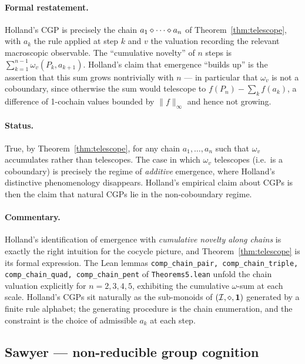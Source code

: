\paragraph{Formal restatement.} Holland's CGP is precisely the chain
$a_1 \mathbin{\diamond} \cdots \mathbin{\diamond} a_n$ of Theorem~\ref{thm:telescope}, with
$a_k$ the rule applied at step $k$ and $v$ the valuation recording the
relevant macroscopic observable. The ``cumulative novelty'' of $n$ steps is
$\sum_{k=1}^{n-1} \omega_v(P_k, a_{k+1})$. Holland's claim that emergence
``builds up'' is the assertion that this sum grows nontrivially with $n$ ---
in particular that $\omega_v$ is not a coboundary, since otherwise the
sum would telescope to $f(P_n) - \sum_k f(a_k)$, a difference of
1-cochain values bounded by $\|f\|_\infty$ and hence not growing.

\paragraph{Status.} True, by Theorem~\ref{thm:telescope}, for any chain
$a_1, \dots, a_n$ such that $\omega_v$ accumulates rather than telescopes.
The case in which $\omega_v$ telescopes (i.e.\ is a coboundary) is precisely
the regime of \emph{additive} emergence, where Holland's distinctive
phenomenology disappears. Holland's empirical claim about CGPs is then the
claim that natural CGPs lie in the non-coboundary regime.

\paragraph{Commentary.} Holland's identification of emergence with
\emph{cumulative novelty along chains} is exactly the right intuition for
the cocycle picture, and Theorem~\ref{thm:telescope} is its formal
expression. The Lean lemmas \texttt{comp\_chain\_pair, comp\_chain\_triple,
comp\_chain\_quad, comp\_chain\_pent} of \texttt{Theorems5.lean} unfold the
chain valuation explicitly for $n = 2, 3, 4, 5$, exhibiting the cumulative
$\omega$-sum at each scale. Holland's CGPs sit naturally as the
sub-monoids of $(\mathcal{I},\mathbin{\diamond},\mathbf{1})$ generated by a finite rule alphabet; the
generating procedure is the chain enumeration, and the constraint is the
choice of admissible $a_k$ at each step.

\subsection{Sawyer --- non-reducible group cognition}\label{sec:zoo:sawyer}


